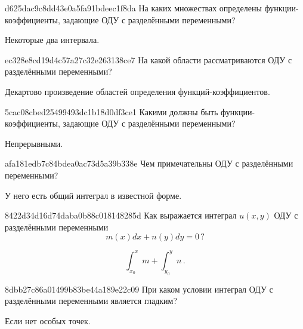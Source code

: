 \begin{note}{d625dac9c8dd43e0a5fa91bdeec1f8da}
    На каких множествах определены функции-коэффициенты, задающие ОДУ с разделёнными переменными?

    \begin{cloze}{1}
        Некоторые два интервала.
    \end{cloze}
\end{note}

\begin{note}{ec328e8cd19d4c57a27c32e263138ce7}
    На какой области рассматриваются ОДУ с разделёнными переменными?

    \begin{cloze}{1}
        Декартово произведение областей определения функций-коэффициентов.
    \end{cloze}
\end{note}

\begin{note}{5cac08cbed25499493dc1b18d0df3ce1}
    Какими должны быть функции-коэффициенты, задающие ОДУ с разделёнными переменными?

    \begin{cloze}{1}
        Непрерывными.
    \end{cloze}
\end{note}

\begin{note}{afa181edb7c84bdea0ac73d5a39b338e}
    Чем примечательны ОДУ с разделёнными переменными?

    \begin{cloze}{1}
        У него есть общий интеграл в известной форме.
    \end{cloze}
\end{note}

\begin{note}{8422d34d16d74daba0b88c018148285d}
    Как выражается интеграл \({ u(x, y) }\) ОДУ с разделёнными переменными
    \[
        m(x) dx + n(y) dy = 0\,?
    \]

    \begin{cloze}{1}
        \[
            \int_{x_0}^{x} m + \int_{y_0}^{y} n\,.
        \]
    \end{cloze}
\end{note}

\begin{note}{8dbb27c86a01499b83be44a189e22c09}
    При каком условии интеграл ОДУ с разделёнными переменными является гладким?

    \begin{cloze}{1}
        Если нет особых точек.
    \end{cloze}
\end{note}

